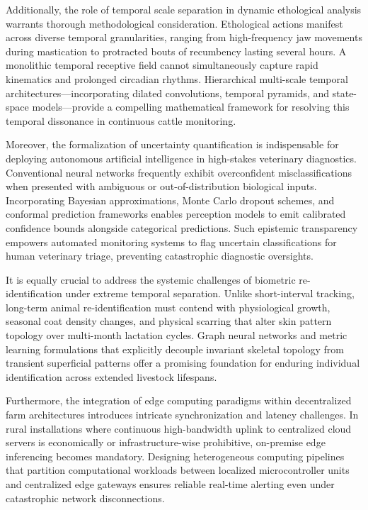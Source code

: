 \documentclass[Times,12pt,oneside,openany,print,index]{report}
\begin{document}
Additionally, the role of temporal scale separation in dynamic ethological analysis warrants thorough methodological consideration. Ethological actions manifest across diverse temporal granularities, ranging from high-frequency jaw movements during mastication to protracted bouts of recumbency lasting several hours. A monolithic temporal receptive field cannot simultaneously capture rapid kinematics and prolonged circadian rhythms. Hierarchical multi-scale temporal architectures—incorporating dilated convolutions, temporal pyramids, and state-space models—provide a compelling mathematical framework for resolving this temporal dissonance in continuous cattle monitoring.

Moreover, the formalization of uncertainty quantification is indispensable for deploying autonomous artificial intelligence in high-stakes veterinary diagnostics. Conventional neural networks frequently exhibit overconfident misclassifications when presented with ambiguous or out-of-distribution biological inputs. Incorporating Bayesian approximations, Monte Carlo dropout schemes, and conformal prediction frameworks enables perception models to emit calibrated confidence bounds alongside categorical predictions. Such epistemic transparency empowers automated monitoring systems to flag uncertain classifications for human veterinary triage, preventing catastrophic diagnostic oversights.

It is equally crucial to address the systemic challenges of biometric re-identification under extreme temporal separation. Unlike short-interval tracking, long-term animal re-identification must contend with physiological growth, seasonal coat density changes, and physical scarring that alter skin pattern topology over multi-month lactation cycles. Graph neural networks and metric learning formulations that explicitly decouple invariant skeletal topology from transient superficial patterns offer a promising foundation for enduring individual identification across extended livestock lifespans.

Furthermore, the integration of edge computing paradigms within decentralized farm architectures introduces intricate synchronization and latency challenges. In rural installations where continuous high-bandwidth uplink to centralized cloud servers is economically or infrastructure-wise prohibitive, on-premise edge inferencing becomes mandatory. Designing heterogeneous computing pipelines that partition computational workloads between localized microcontroller units and centralized edge gateways ensures reliable real-time alerting even under catastrophic network disconnections.
\end{document}
